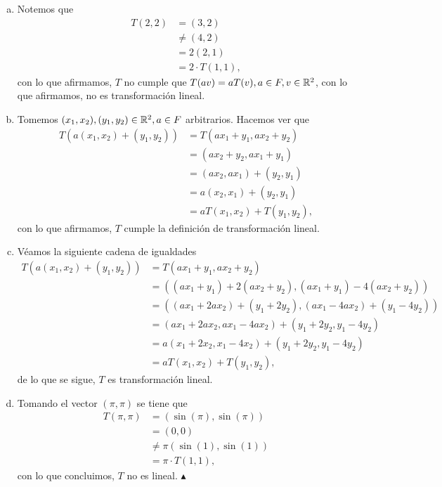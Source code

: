 \documentclass[11pt]{scrartcl}
\begin{document}
\begin{enumerate}[a)]
    \item Notemos que
    \begin{align*}
        T(2,2) &= (3,2) \\
        &\neq (4,2) \\
        &= 2(2,1) \\
        &= 2 \cdot T(1,1),
    \end{align*}
    con lo que afirmamos, $T$ no cumple que $T(av)=aT(v),a\in F, v \in \mathbb R^2$, con lo que afirmamos, no es transformación lineal.
    \item Tomemos $(x_1,x_2),(y_1,y_2) \in \mathbb R^2, a\in F$ arbitrarios. Hacemos ver que
    \begin{align*}
        T(a(x_1,x_2)+(y_1,y_2)) &= T(ax_1+y_1,ax_2+y_2) \\
        &= (ax_2+y_2,ax_1+y_1) \\
        &= (ax_2,ax_1) + (y_2,y_1) \\
        &= a(x_2,x_1) + (y_2,y_1) \\
        &= aT(x_1,x_2) + T(y_1,y_2),
    \end{align*}
    con lo que afirmamos, $T$ cumple la definición de transformación lineal.
    \item Véamos la siguiente cadena de igualdades
    \begin{align*}
        T(a(x_1,x_2)+(y_1,y_2)) &= T(ax_1+y_1,ax_2+y_2) \\
        &= ((ax_1+y_1) + 2(ax_2+y_2), (ax_1+y_1) - 4(ax_2+y_2)) \\
        &= ((ax_1+2ax_2) + (y_1+ 2y_2), (ax_1-4ax_2) + (y_1-4y_2)) \\
        &= (ax_1+2ax_2,ax_1-4ax_2) + (y_1+2y_2,y_1-4y_2) \\
        &= a(x_1+2x_2,x_1-4x_2) + (y_1+2y_2,y_1-4y_2) \\
        &= aT(x_1,x_2)+T(y_1,y_2),
    \end{align*}
    de lo que se sigue, $T$ es transformación lineal.
    \item Tomando el vector $(\pi,\pi)$ se tiene que
    \begin{align*}
        T(\pi,\pi) &= (\sin(\pi),\sin(\pi)) \\
        &= (0,0) \\
        &\neq \pi(\sin(1),\sin(1)) \\
        &= \pi\cdot T(1,1),
    \end{align*}
    con lo que concluimos, $T$ no es lineal. $\blacktriangle$
\end{enumerate}
\end{document}
